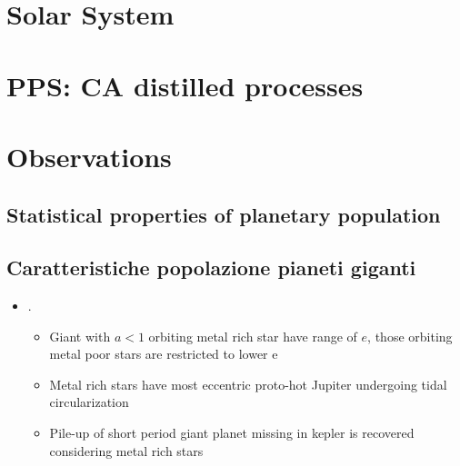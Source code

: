 \part{Solar System}

\part{PPS: CA distilled processes}

\part{Observations}

\chapter{Statistical properties of planetary population}

\chapter{Caratteristiche popolazione pianeti giganti}

\begin{itemize}
    \item \cite{dawson2013giant}.
    \begin{itemize}
        \item Giant with $a<1$ orbiting metal rich star have range of $e$, those orbiting metal poor stars are restricted to lower e
        \item Metal rich stars have most eccentric proto-hot Jupiter undergoing tidal circularization
        \item Pile-up of short period giant planet missing in kepler is recovered considering metal rich stars
    \end{itemize}
\end{itemize}


